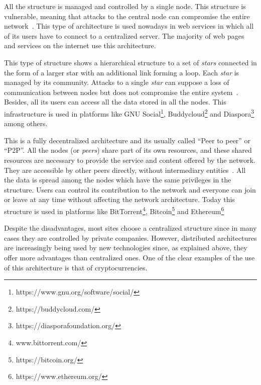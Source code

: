 \begin{itemize}
   All the structure is managed and controlled
  by a single node. This structure is vulnerable, meaning that attacks to the
  central node can compromise the entire network~\cite{baran1964distributed}.
  This type of architecture is used nowadays in web services in which all of its
  users have to connect to a centralized server. The majority of web pages and
  services on the internet use this architecture.
  
   This type of structure shows a hierarchical
  structure to a set of \emph{stars} connected in the form of a larger star with
  an additional link forming a loop. Each \emph{star} is managed by its
  community. Attacks to a single \emph{star} can suppose a loss of communication
  between nodes but does not compromise the entire
  system~\cite{baran1964distributed}. Besides, all its users can access all the
  data stored in all the nodes. This infrastructure is used in platforms like
  GNU Social\footnote{https://www.gnu.org/software/social/},
  Buddycloud\footnote{https://buddycloud.com/} and
  Diaspora\footnote{https://diasporafoundation.org/} among others.

   This is a fully decentralized architecture
  and its usually called ``Peer to peer'' or ``P2P''. All the nodes (or
  \emph{peers}) share part of its own resources, and these shared resources are
  necessary to provide the service and content offered by the network. They are
  accessible by other peers directly, without intermediary
  entities~\cite{schollmeier2001definition}. All the data is spread among the
  nodes which have the same privileges in the structure. Users can control its
  contribution to the network and everyone can join or leave at any time without
  affecting the network architecture. Today this structure is used in platforms
  like BitTorrent\footnote{www.bittorrent.com/},
  Bitcoin\footnote{https://bitcoin.org/} and
  Ethereum\footnote{https://www.ethereum.org/}
\end{itemize}

Despite the disadvantages, most sites choose a centralized structure since in
many cases they are controlled by private companies. However, distributed
architectures are increasingly being used by new technologies since, as
explained above, they offer more advantages than centralized ones. One of the
clear examples of the use of this architecture is that of cryptocurrencies.

